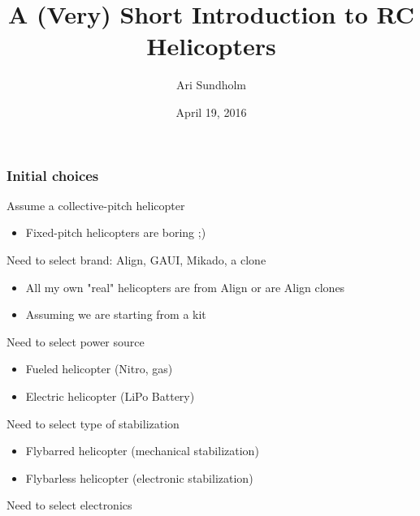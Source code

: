 \documentclass{beamer}
\title{A (Very) Short Introduction to RC Helicopters}
\author{Ari Sundholm}
\date{April 19, 2016}
\begin{document}
 
\frame{\titlepage}

\begin{frame}
\frametitle{Initial choices}

Assume a collective-pitch helicopter
\begin{itemize}
	\item Fixed-pitch helicopters are boring ;)
\end{itemize}

Need to select brand: Align, GAUI, Mikado, a clone
\begin{itemize}
	\item All my own "real" helicopters are from Align or are Align clones
	\item Assuming we are starting from a kit
\end{itemize}

Need to select power source
\begin{itemize}
	\item Fueled helicopter (Nitro, gas)
	\item Electric helicopter (LiPo Battery)
\end{itemize}

Need to select type of stabilization
\begin{itemize}
	\item Flybarred helicopter (mechanical stabilization)
	\item Flybarless helicopter (electronic stabilization)
\end{itemize}

Need to select electronics

\end{frame}
\end{document}
